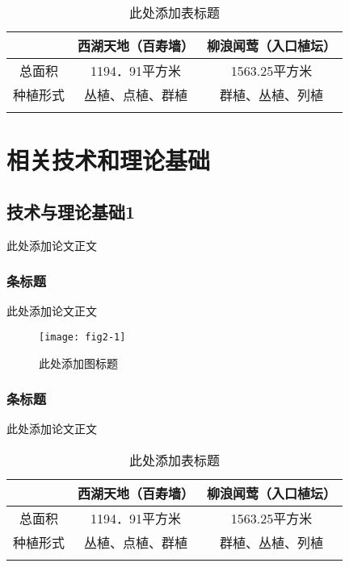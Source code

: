 \documentclass{article}
\begin{document}
\begin{table}[H]
\centering
\caption{此处添加表标题}\label{tab1-1}
\begin{tabular}{!{\vrule width1.2pt}c|c|c!{\vrule width1.2pt}}
\Xhline{1.2pt}
 & 西湖天地（百寿墙） & 柳浪闻莺（入口植坛）\\ \hline
总面积 & 1194．91平方米 & 1563.25平方米\\ \hline
种植形式 & 丛植、点植、群植  & 群植、丛植、列植\\ \Xhline{1.2pt}
\end{tabular}
\end{table}

\section{相关技术和理论基础}

\subsection{技术与理论基础1}
此处添加论文正文\cite{huwei2017latex2e}

\subsubsection{条标题}
此处添加论文正文

\begin{figure}[H]
\centering
\texttt{[image: fig2-1]}
\caption{此处添加图标题}\label{fig2-1}
\end{figure}

\subsubsection{条标题}
此处添加论文正文

\begin{table}[H]
\centering
\caption{此处添加表标题}\label{tab1-1}
\begin{tabular}{!{\vrule width1.2pt}c|c|c!{\vrule width1.2pt}}
\Xhline{1.2pt}
 & 西湖天地（百寿墙） & 柳浪闻莺（入口植坛）\\ \hline
总面积 & 1194．91平方米 & 1563.25平方米\\ \hline
种植形式 & 丛植、点植、群植  & 群植、丛植、列植\\ \Xhline{1.2pt}
\end{tabular}
\end{table}
\end{document}

